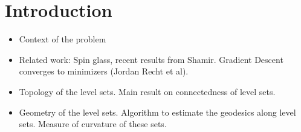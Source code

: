 \section{Introduction}
\label{sec:Intro}

\begin{itemize}
\item Context of the problem
\item Related work: Spin glass, recent results from Shamir. Gradient Descent converges to minimizers (Jordan Recht et al). 
\item Topology of the level sets. Main result on connectedness of level sets.
\item Geometry of the level sets. Algorithm to estimate the geodesics along level sets. Measure of curvature of these sets. 
\end{itemize}
